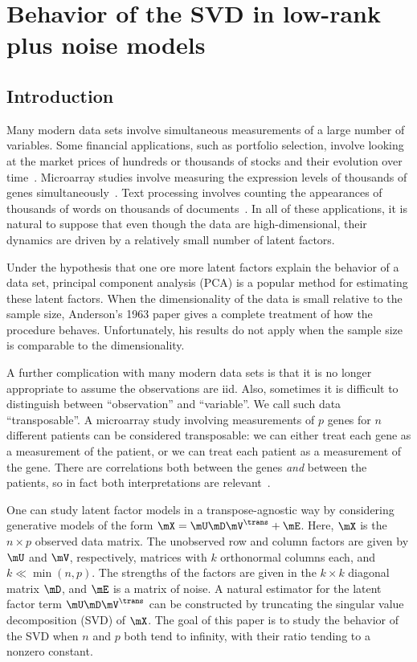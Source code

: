 
\chapter[Behavior of the SVD]{Behavior of the SVD in low-rank plus noise models}\label{C:svd-behavior}

\section{Introduction}

Many modern data sets involve simultaneous measurements of a large number of
variables. Some financial applications, such as portfolio selection, involve
looking at the market prices of hundreds or thousands of stocks and their
evolution over time~\cite{markowitz1952ps}. Microarray studies
involve measuring the expression levels of thousands of
genes simultaneously~\cite{schena1995qmg}.  Text processing involves counting
the appearances of thousands of words on thousands of documents~\cite{manning1999fsn}.  In all of these
applications, it is natural to suppose that even though the data are
high-dimensional, their dynamics are driven by a relatively small number of
latent factors.

Under the hypothesis that one ore more latent factors explain the behavior
of a data set, principal component analysis (PCA) \cite{jolliffe2002pca} is a
popular method for estimating these latent factors.  When the dimensionality
of the data is small relative to the sample size, Anderson's 1963 paper
\cite{anderson1963atp} gives a complete treatment of how the procedure
behaves.  Unfortunately, his results do not apply when the sample size is
comparable to the dimensionality.

A further complication with many modern data sets is that it is no longer
appropriate to assume the observations are iid. Also, sometimes it is
difficult to distinguish between ``observation'' and ``variable''. We call such
data ``transposable''. A microarray study involving measurements of $p$ genes
for $n$ different patients can be considered transposable: we can either treat
each gene as a measurement of the patient, or we can treat each patient as a
measurement of the gene. There are correlations both between the genes
\emph{and} between the patients, so in fact both interpretations are relevant~\cite{efron2008smi}.

One can study latent factor models in a transpose-agnostic way by considering
generative models of the form $\mX = \mU \mD \mV^\trans + \mE$. Here, $\mX$ is
the $n \times p$ observed data matrix. The unobserved row and column factors
are given by $\mU$ and $\mV$, respectively, matrices with $k$ orthonormal
columns each, and $k \ll \min(n,p)$. The strengths of the factors are given
in the $k\times k$ diagonal matrix $\mD$, and $\mE$ is a matrix of noise. A
natural estimator for the latent factor term $\mU \mD \mV^\trans$ can be
constructed by truncating the singular value decomposition (SVD)
\cite{golub1996mc} of $\mX$. The goal of this paper is to study the behavior
of the SVD when $n$ and $p$ both tend to infinity, with their ratio tending to
a nonzero constant.

